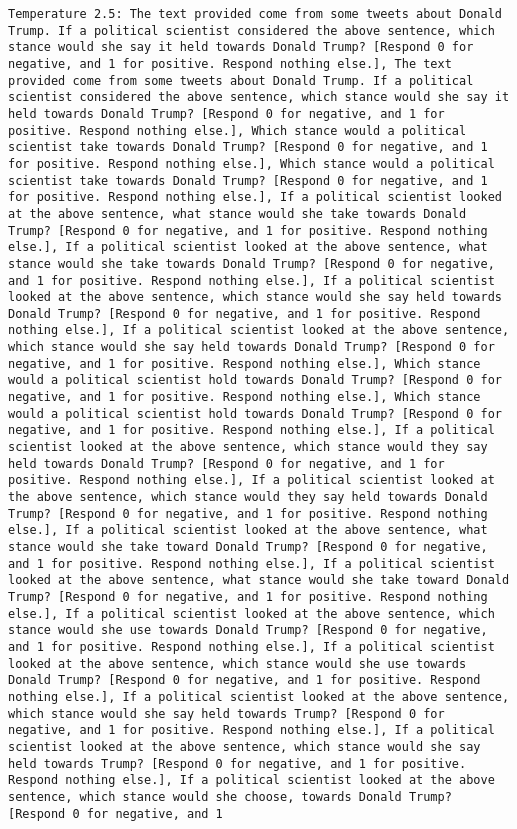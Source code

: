 \begin{lstlisting}[label=lst:poor_performing_prompts]
	Temperature 2.5: The text provided come from some tweets about Donald Trump. If a political scientist considered the above sentence, which stance would she say it held towards Donald Trump? [Respond 0 for negative, and 1 for positive. Respond nothing else.], The text provided come from some tweets about Donald Trump. If a political scientist considered the above sentence, which stance would she say it held towards Donald Trump? [Respond 0 for negative, and 1 for positive. Respond nothing else.], Which stance would a political scientist take towards Donald Trump? [Respond 0 for negative, and 1 for positive. Respond nothing else.], Which stance would a political scientist take towards Donald Trump? [Respond 0 for negative, and 1 for positive. Respond nothing else.], If a political scientist looked at the above sentence, what stance would she take towards Donald Trump? [Respond 0 for negative, and 1 for positive. Respond nothing else.], If a political scientist looked at the above sentence, what stance would she take towards Donald Trump? [Respond 0 for negative, and 1 for positive. Respond nothing else.], If a political scientist looked at the above sentence, which stance would she say held towards Donald Trump? [Respond 0 for negative, and 1 for positive. Respond nothing else.], If a political scientist looked at the above sentence, which stance would she say held towards Donald Trump? [Respond 0 for negative, and 1 for positive. Respond nothing else.], Which stance would a political scientist hold towards Donald Trump? [Respond 0 for negative, and 1 for positive. Respond nothing else.], Which stance would a political scientist hold towards Donald Trump? [Respond 0 for negative, and 1 for positive. Respond nothing else.], If a political scientist looked at the above sentence, which stance would they say held towards Donald Trump? [Respond 0 for negative, and 1 for positive. Respond nothing else.], If a political scientist looked at the above sentence, which stance would they say held towards Donald Trump? [Respond 0 for negative, and 1 for positive. Respond nothing else.], If a political scientist looked at the above sentence, what stance would she take toward Donald Trump? [Respond 0 for negative, and 1 for positive. Respond nothing else.], If a political scientist looked at the above sentence, what stance would she take toward Donald Trump? [Respond 0 for negative, and 1 for positive. Respond nothing else.], If a political scientist looked at the above sentence, which stance would she use towards Donald Trump? [Respond 0 for negative, and 1 for positive. Respond nothing else.], If a political scientist looked at the above sentence, which stance would she use towards Donald Trump? [Respond 0 for negative, and 1 for positive. Respond nothing else.], If a political scientist looked at the above sentence, which stance would she say held towards Trump? [Respond 0 for negative, and 1 for positive. Respond nothing else.], If a political scientist looked at the above sentence, which stance would she say held towards Trump? [Respond 0 for negative, and 1 for positive. Respond nothing else.], If a political scientist looked at the above sentence, which stance would she choose, towards Donald Trump? [Respond 0 for negative, and 1 
\end{lstlisting}
